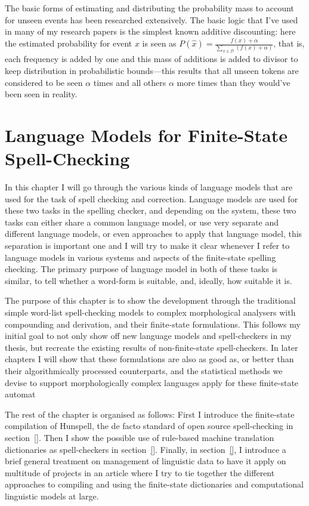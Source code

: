 \documentclass[officiallayout,draft]{unihelcompling}
\begin{document}
The basic forms of estimating and distributing the probability mass to account
for unseen events has been researched extensively. The basic logic that I've
used in many of my research papers is the simplest known additive discounting:
here the estimated probability for event $x$ is seen as 
$P(\hat{x}) = \frac{f(x) + \alpha}{\sum_{x \in \mathcal{D}}(f(x) + \alpha)}$,
that is, each frequency is added by one and this mass of additions is added to
divisor to keep distribution in probabilistic bounds---this results that all
unseen tokens are considered to be seen $\alpha$ times and all others $\alpha$
more times than they would've been seen in reality. 



\chapter{Language Models for Finite-State Spell-Checking}
\label{chap:language-models}

In this chapter I will go through the various kinds of language models that are
used for the task of spell checking and correction. Language models are used
for these two tasks in the spelling checker, and depending on the system,
these two tasks can either share a common language model, or use very
separate and different language models, or even approaches to apply that
language model, this separation is important one and I will try to make it
clear whenever I refer to language models in various systems and aspects of
the finite-state spelling checking. The primary purpose of language model in
both of these tasks is similar, to tell whether a word-form is suitable, and,
ideally, how suitable it is.

The purpose of this chapter is to show the development through the traditional
simple word-list spell-checking models to complex morphological analysers with
compounding and derivation, and their finite-state formulations. This follows
my initial goal to not only show off new language models and spell-checkers
in my thesis, but recreate the existing results of non-finite-state 
spell-checkers. In later chapters I will show that these formulations are
also as good as, or better than their algorithmically processed counterparts,
and the statistical methods we devise to support morphologically complex
languages apply for these finite-state automat 

The rest of the chapter is organised as follows: First I introduce the
finite-state compilation of Hunspell, the de facto standard of open source
spell-checking in section~\ref{}.  Then I show the possible use of rule-based
machine translation dictionaries as spell-checkers in section~\ref{}.  Finally,
in section~\ref{}, I introduce a brief general treatment on management of
linguistic data to have it apply on multitude of projects in an article where I
try to tie together the different approaches to compiling and using the
finite-state dictionaries and computational linguistic models at large.
\end{document}
